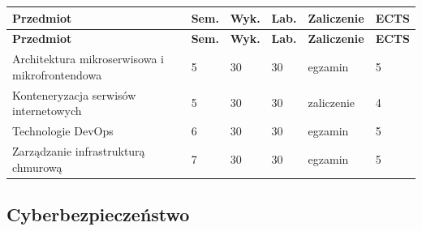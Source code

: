 \documentclass[12pt,a4paper]{article}
\newcommand{\thdrule}{\noalign{\global\setlength{\extrarowheight}{0pt}}}
\newcommand{\thdend}{\noalign{\global\setlength{\extrarowheight}{4pt}}}
\begin{document}
{\scriptsize
\begin{longtable}{m{6.5cm}m{0.7cm}m{1cm}m{1cm}m{1.7cm}m{0.7cm}}
\thdrule\toprule
\rowcolor{pjatkRed}
{\color{white}\footnotesize\textbf{\vphantom{Ag}Przedmiot}} & {\color{white}\footnotesize\textbf{\vphantom{Ag}Sem.}} & {\color{white}\footnotesize\textbf{\vphantom{Ag}Wyk.}} & {\color{white}\footnotesize\textbf{\vphantom{Ag}Lab.}} & {\color{white}\footnotesize\textbf{\vphantom{Ag}Zaliczenie}} & {\color{white}\footnotesize\textbf{\vphantom{Ag}ECTS}} \\
\midrule\thdend
\endfirsthead
\thdrule\toprule
\rowcolor{pjatkRed}
{\color{white}\footnotesize\textbf{\vphantom{Ag}Przedmiot}} & {\color{white}\footnotesize\textbf{\vphantom{Ag}Sem.}} & {\color{white}\footnotesize\textbf{\vphantom{Ag}Wyk.}} & {\color{white}\footnotesize\textbf{\vphantom{Ag}Lab.}} & {\color{white}\footnotesize\textbf{\vphantom{Ag}Zaliczenie}} & {\color{white}\footnotesize\textbf{\vphantom{Ag}ECTS}} \\
\midrule\thdend
\endhead
\rowcolor{tableRowLight} Architektura mikroserwisowa i mikrofrontendowa & 5 & 30 & 30 & {\scriptsize egzamin} & 5 \\
\rowcolor{tableRowAlt} Konteneryzacja serwisów internetowych & 5 & 30 & 30 & {\scriptsize zaliczenie} & 4 \\
\rowcolor{tableRowLight} Technologie DevOps & 6 & 30 & 30 & {\scriptsize egzamin} & 5 \\
\rowcolor{tableRowAlt} Zarządzanie infrastrukturą chmurową & 7 & 30 & 30 & {\scriptsize egzamin} & 5 \\
\bottomrule
\end{longtable}}

\subsection*{Cyberbezpieczeństwo}
\end{document}
